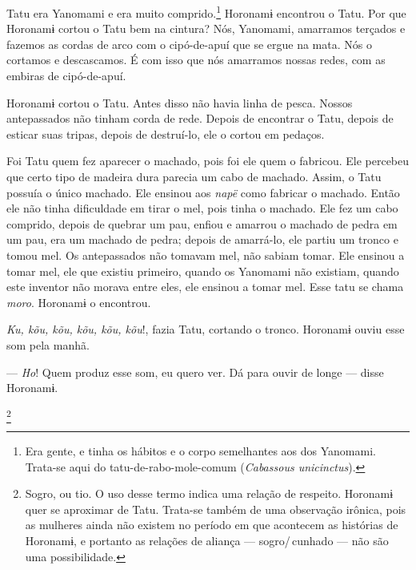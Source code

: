  Tatu era Yanomami e era muito comprido.\footnote{Era gente, e tinha os hábitos e o corpo semelhantes aos dos Yanomami. Trata-se aqui do tatu-de-rabo-mole-comum (\textit{Cabassous unicinctus}).}  Horonamɨ encontrou o Tatu. Por que Horonamɨ cortou o Tatu bem na cintura? Nós, Yanomami, amarramos terçados e fazemos as cordas de arco com o cipó-de-apuí que se ergue na
mata. Nós o cortamos e descascamos. É com isso que nós amarramos nossas
redes, com as embiras de cipó-de-apuí. 

Horonamɨ cortou o Tatu. Antes disso não havia linha de pesca. Nossos
antepassados não tinham corda de rede. Depois de encontrar o Tatu,
depois de esticar suas tripas, depois de destruí-lo, ele o cortou em
pedaços. 

Foi Tatu quem fez aparecer o machado, pois foi ele quem o fabricou. Ele
percebeu que certo tipo de madeira dura parecia um cabo de machado.
Assim, o Tatu possuía o único machado. Ele ensinou aos \textit{napë} como
fabricar o machado. Então ele não tinha dificuldade em tirar o mel, pois
tinha o machado. Ele fez um cabo comprido, depois de quebrar um pau,
enfiou e amarrou o machado de pedra em um pau, era um machado de pedra;
depois de amarrá-lo, ele partiu um tronco e tomou mel. Os antepassados
não tomavam mel, não sabiam tomar. Ele ensinou a tomar mel, ele que
existiu primeiro, quando os Yanomami não existiam, quando este inventor
não morava entre eles, ele ensinou a tomar mel. Esse tatu se
chama \textit{moro}. Horonamɨ o encontrou. 

\textit{Ku, kõu, kõu, kõu, kõu, kõu}!, fazia Tatu, cortando o tronco.
Horonamɨ ouviu esse som pela manhã. 

--- \textit{Ho}! Quem produz esse som, eu quero ver. Dá para ouvir de longe --- disse
Horonamɨ. 

\footnote{Sogro, ou tio. O uso desse termo indica uma relação de respeito. Horonamɨ quer se aproximar de Tatu. Trata-se também de uma observação irônica, pois as mulheres ainda não existem no período em que acontecem as histórias de Horonamɨ, e portanto as relações de aliança --- sogro/\,cunhado --- não são uma possibilidade.}

